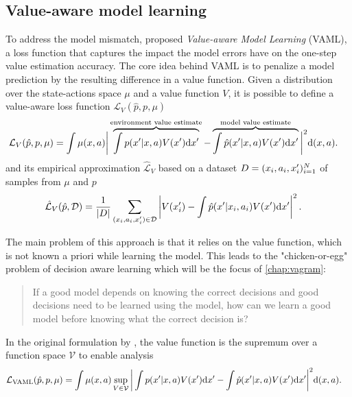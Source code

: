 \subsection{Value-aware model learning}

To address the model mismatch, \textcite{vaml} proposed \emph{Value-aware Model Learning} (VAML), a loss function that captures the impact the model errors have on the one-step value estimation accuracy.
The core idea behind VAML is to penalize a model prediction by the resulting difference in a value function. Given a distribution over the state-actions space $\mu$ and a value function $V$, it is possible to define a value-aware loss function $\mathcal{L}_V(\hat{p}, p, \mu)$
\begin{align}
    &\mathcal{L}_V(\hat{p}, p, \mu) = \int \mu(x,a) \bigg|\overbrace{\int p(x'|x,a)V(x')\mathrm{d}x'}^{\text{environment value estimate}}  - \overbrace{\int \hat{p}(x'|x,a) V(x') \mathrm{d}x'}^{\text{model value estimate}}\bigg|^2 \mathrm{d} (x,a).
\end{align}
and its empirical approximation $\hat{\mathcal{L}}_V$ based on a dataset $D = (x_i,a_i,x'_i)_{i=1}^N$ of samples from $\mu$ and $p$
\begin{align}
    &\hat{\mathcal{L}}_V(\hat{p}, \mathcal{D}) = \frac{1}{|D|}\sum_{(x_i,a_i,x'_i)\in\mathcal{D}} \left|V(x'_i) - \int \hat{p}(x'|x_i,a_i) V(x') \mathrm{d} x'\right|^2\label{eq:background:IterVAMLloss}.
\end{align}

The main problem of this approach is that it relies on the value function, which is not known a priori while learning the model. 
This leads to the "chicken-or-egg" problem of decision aware learning which will be the focus of \autoref{chap:vagram}:

\begin{quote}
    {If a good model depends on knowing the correct decisions and good decisions need to be learned using the model, how can we learn a good model before knowing what the correct decision is?}
\end{quote}

In the original formulation by \textcite{vaml}, the value function is the supremum over a function space $\mathcal{V}$ to enable analysis
\begin{align}
    &\mathcal{L}_\text{VAML}(\hat{p}, p, \mu) = \int \mu(x,a) \sup_{V\in \mathcal{V}}\bigg|\int p(x'|x,a)V(x')\mathrm{d}x'  - \int \hat{p}(x'|x,a) V(x') \mathrm{d}x'\bigg|^2 \mathrm{d} (x,a).
\end{align}

